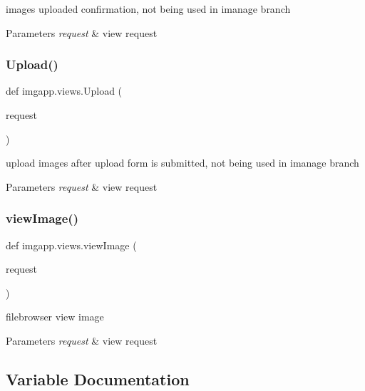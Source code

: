 images uploaded confirmation, not being used in imanage branch 


\begin{DoxyParams}{Parameters}
{\em request} & view request \\
\hline
\end{DoxyParams}
\mbox{\label{namespaceimgapp_1_1views_a30bd5c7a24785551afd3da58fa259a6b}} 
\subsubsection{\texorpdfstring{Upload()}{Upload()}}
{\footnotesize\ttfamily def imgapp.\+views.\+Upload (\begin{DoxyParamCaption}\item[{}]{request }\end{DoxyParamCaption})}



upload images after upload form is submitted, not being used in imanage branch 


\begin{DoxyParams}{Parameters}
{\em request} & view request \\
\hline
\end{DoxyParams}
\mbox{\label{namespaceimgapp_1_1views_a79dd171b98f07f4649cd2e44644ab8e0}} 
\subsubsection{\texorpdfstring{view\+Image()}{viewImage()}}
{\footnotesize\ttfamily def imgapp.\+views.\+view\+Image (\begin{DoxyParamCaption}\item[{}]{request }\end{DoxyParamCaption})}



filebrowser view image 


\begin{DoxyParams}{Parameters}
{\em request} & view request \\
\hline
\end{DoxyParams}


\subsection{Variable Documentation}
\mbox{\label{namespaceimgapp_1_1views_ace59bf1ee23e1e68ab25883a1ab83a07}} 
